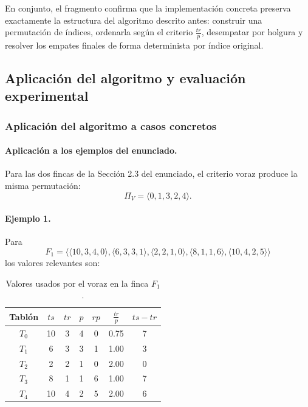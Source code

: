 \documentclass[12pt,a4paper]{article}
\begin{document}
En conjunto, el fragmento confirma que la implementaci\'on concreta preserva exactamente la estructura del algoritmo descrito antes: construir una permutaci\'on de \'indices, ordenarla seg\'un el criterio \(\frac{tr}{p}\), desempatar por holgura y resolver los empates finales de forma determinista por \'indice original.

\subsection{Aplicaci\'on del algoritmo y evaluaci\'on experimental}

\subsubsection{Aplicaci\'on del algoritmo a casos concretos}

\paragraph{Aplicaci\'on a los ejemplos del enunciado.}
Para las dos fincas de la Secci\'on 2.3 del enunciado, el criterio voraz produce la misma permutaci\'on:
\[
\Pi_V = \langle 0,1,3,2,4 \rangle.
\]

\paragraph{Ejemplo 1.}
Para
\[
F_1=\langle\langle 10,3,4,0\rangle,\langle 6,3,3,1\rangle,\langle 2,2,1,0\rangle,\langle 8,1,1,6\rangle,\langle 10,4,2,5\rangle\rangle
\]
los valores relevantes son:

\begin{table}[ht]
  \centering
  \small
  \begin{tabular}{ccccccc}
    \toprule
    Tabl\'on & \(ts\) & \(tr\) & \(p\) & \(rp\) & \(\frac{tr}{p}\) & \(ts-tr\) \\
    \midrule
    \(T_0\) & 10 & 3 & 4 & 0 & 0.75 & 7 \\
    \(T_1\) & 6 & 3 & 3 & 1 & 1.00 & 3 \\
    \(T_2\) & 2 & 2 & 1 & 0 & 2.00 & 0 \\
    \(T_3\) & 8 & 1 & 1 & 6 & 1.00 & 7 \\
    \(T_4\) & 10 & 4 & 2 & 5 & 2.00 & 6 \\
    \bottomrule
  \end{tabular}
  \caption{Valores usados por el voraz en la finca \(F_1\).}
\end{table}
\end{document}
